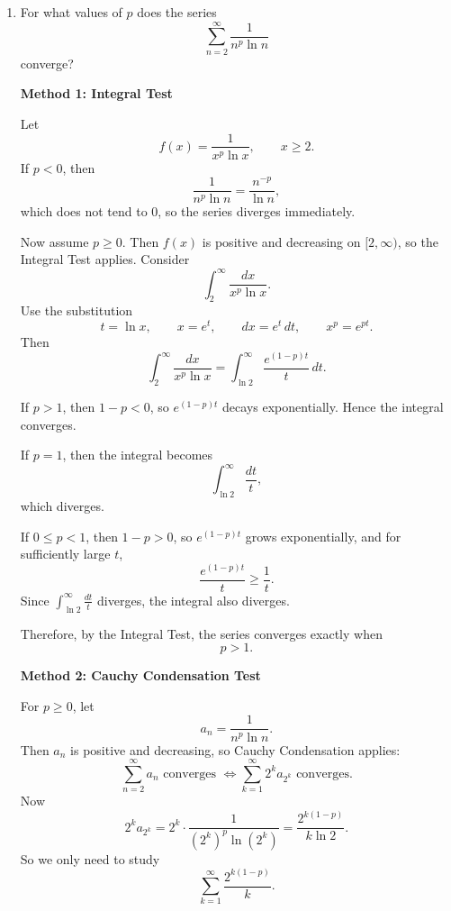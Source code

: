 \documentclass[a4paper,12pt,twocolumn]{article}
\newenvironment{solutionbox}{\begin{framed}}{\end{framed}}
\begin{document}
\begin{enumerate}[label=\textbf{\arabic*.}, leftmargin=2em, itemsep=1.2em]
\begin{solutionbox}
Because
\[
\frac{p+1}{2}>1,
\]
the series
\[
\sum_{n=1}^{\infty}\frac{1}{n^{(p+1)/2}}
\]
converges. By the Comparison Test,
\[
\sum_{n=1}^{\infty}\frac{\ln n}{n^p}
\]
also converges for \(p>1\).

\medskip
\textbf{Answer:}
\[
\boxed{\text{The series converges exactly when } p>1.}
\]
\end{solutionbox}

\setcounter{enumi}{45}
\item For what values of \(p\) does the series
\[
\sum_{n=2}^{\infty}\frac{1}{n^p\ln n}
\]
converge?

\begin{solutionbox}
\textbf{Method 1: Integral Test}

Let
\[
f(x)=\frac{1}{x^p\ln x}, \qquad x\ge 2.
\]
If \(p<0\), then
\[
\frac{1}{n^p\ln n}=\frac{n^{-p}}{\ln n},
\]
which does not tend to \(0\), so the series diverges immediately.

Now assume \(p\ge 0\). Then \(f(x)\) is positive and decreasing on \([2,\infty)\), so the Integral Test applies. Consider
\[
\int_2^\infty \frac{dx}{x^p\ln x}.
\]
Use the substitution
\[
t=\ln x, \qquad x=e^t,\qquad dx=e^t\,dt,\qquad x^p=e^{pt}.
\]
Then
\[
\int_2^\infty \frac{dx}{x^p\ln x}
=
\int_{\ln 2}^{\infty}\frac{e^{(1-p)t}}{t}\,dt.
\]

If \(p>1\), then \(1-p<0\), so \(e^{(1-p)t}\) decays exponentially. Hence the integral converges.

If \(p=1\), then the integral becomes
\[
\int_{\ln 2}^{\infty}\frac{dt}{t},
\]
which diverges.

If \(0\le p<1\), then \(1-p>0\), so \(e^{(1-p)t}\) grows exponentially, and for sufficiently large \(t\),
\[
\frac{e^{(1-p)t}}{t}\ge \frac{1}{t}.
\]
Since \(\int_{\ln 2}^{\infty}\frac{dt}{t}\) diverges, the integral also diverges.

Therefore, by the Integral Test, the series converges exactly when
\[
p>1.
\]
\end{solutionbox}

\begin{solutionbox}
\textbf{Method 2: Cauchy Condensation Test}

For \(p\ge 0\), let
\[
a_n=\frac{1}{n^p\ln n}.
\]
Then \(a_n\) is positive and decreasing, so Cauchy Condensation applies:
\[
\sum_{n=2}^{\infty} a_n \text{ converges }
\Longleftrightarrow
\sum_{k=1}^{\infty}2^k a_{2^k}\text{ converges.}
\]
Now
\[
2^k a_{2^k}
=
2^k\cdot \frac{1}{(2^k)^p\ln(2^k)}
=
\frac{2^{k(1-p)}}{k\ln 2}.
\]
So we only need to study
\[
\sum_{k=1}^{\infty}\frac{2^{k(1-p)}}{k}.
\]


\end{solutionbox}
\end{enumerate}
\end{document}
